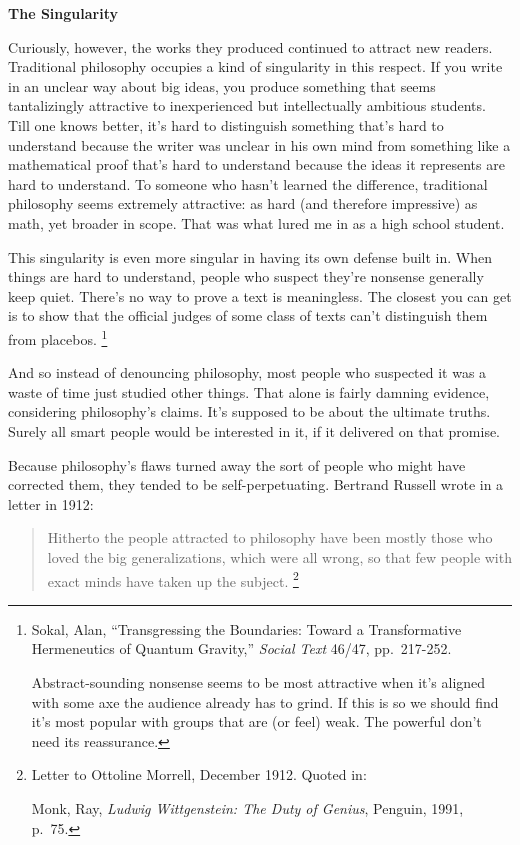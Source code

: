 \documentclass[12pt]{book}
\begin{document}
\textbf{The Singularity}

Curiously, however, the works they produced continued to attract new
readers. Traditional philosophy occupies a kind of singularity in this
respect. If you write in an unclear way about big ideas, you produce
something that seems tantalizingly attractive to inexperienced but
intellectually ambitious students. Till one knows better, it's hard to
distinguish something that's hard to understand because the writer was
unclear in his own mind from something like a mathematical proof that's
hard to understand because the ideas it represents are hard to
understand. To someone who hasn't learned the difference, traditional
philosophy seems extremely attractive: as hard (and therefore
impressive) as math, yet broader in scope. That was what lured me in as
a high school student.

This singularity is even more singular in having its own defense built
in. When things are hard to understand, people who suspect they're
nonsense generally keep quiet. There's no way to prove a text is
meaningless. The closest you can get is to show that the official judges
of some class of texts can't distinguish them from placebos.
\footnote{Sokal, Alan, ``Transgressing the Boundaries: Toward a
Transformative Hermeneutics of Quantum Gravity,'' \emph{Social Text}
46/47, pp.~217-252.

Abstract-sounding nonsense seems to be most attractive when it's aligned
with some axe the audience already has to grind. If this is so we should
find it's most popular with groups that are (or feel) weak. The powerful
don't need its reassurance.}

And so instead of denouncing philosophy, most people who suspected it
was a waste of time just studied other things. That alone is fairly
damning evidence, considering philosophy's claims. It's supposed to be
about the ultimate truths. Surely all smart people would be interested
in it, if it delivered on that promise.

Because philosophy's flaws turned away the sort of people who might have
corrected them, they tended to be self-perpetuating. Bertrand Russell
wrote in a letter in 1912:

\begin{quote}
Hitherto the people attracted to philosophy have been mostly those who
loved the big generalizations, which were all wrong, so that few people
with exact minds have taken up the subject. \footnote{Letter to Ottoline Morrell, December 1912. Quoted in:

Monk, Ray, \emph{Ludwig Wittgenstein: The Duty of Genius}, Penguin,
1991, p.~75.}
\end{quote}
\end{document}
